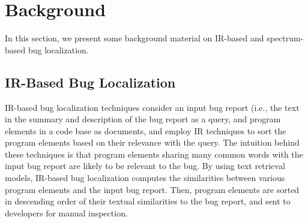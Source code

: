 \section{Background}
\label{sec.prelim}

In this section, we present some background material on IR-based and spectrum-based bug localization.



\subsection{IR-Based Bug Localization}
\label{sec.IR-based} 

IR-based bug localization techniques consider an input bug report (i.e., the text in the summary and description of the bug report as a query, and program elements in a code base as documents, and employ IR techniques to sort the program elements based on their relevance with the query. The intuition behind these techniques is that program elements sharing many common words with the input bug report are likely to be relevant to the bug. By using text retrieval models, IR-based bug localization computes the similarities between various program elements and the input bug report. Then, program elements are sorted in descending order of their textual similarities to the bug report, and sent to developers for manual inspection.

%    
%    
%    
%    

